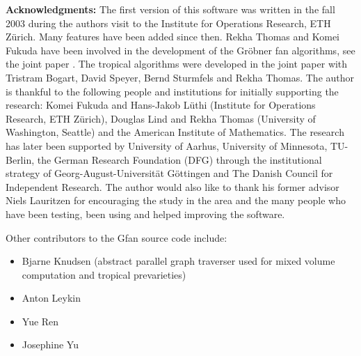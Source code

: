 \vspace{1cm}
\noindent
{\bf Acknowledgments:} The first version of this software was written
in the fall 2003 during the authors visit to the Institute for
Operations Research, ETH Z\"urich. Many features have been added since
then. Rekha Thomas and Komei Fukuda have been involved in the
development of the Gr\"obner fan algorithms, see the joint paper
\cite{fukuda}. The tropical algorithms were developed in the joint
paper \cite{ctv} with Tristram Bogart, David Speyer, Bernd Sturmfels
and Rekha Thomas. The author is thankful to the following people and
institutions for initially supporting the research: Komei Fukuda and Hans-Jakob
L\"uthi (Institute for Operations Research, ETH Z\"urich), Douglas
Lind and Rekha Thomas (University of Washington, Seattle) and the
American Institute of Mathematics. The research has
later been supported by University of Aarhus, University of Minnesota, TU-Berlin, the German Research Foundation (DFG) through the institutional strategy of Georg-August-Universit\"at G\"ottingen and The Danish Council for Independent Research. The author would also like to thank his former advisor Niels
Lauritzen for encouraging the study in the area and the many people who have been testing, been using and helped improving the software.

Other contributors to the Gfan source code include:
\begin{itemize}
\item Bjarne Knudsen (abstract parallel graph traverser used for mixed volume computation and tropical prevarieties)
\item Anton Leykin
\item Yue Ren
\item Josephine Yu
\end{itemize}

